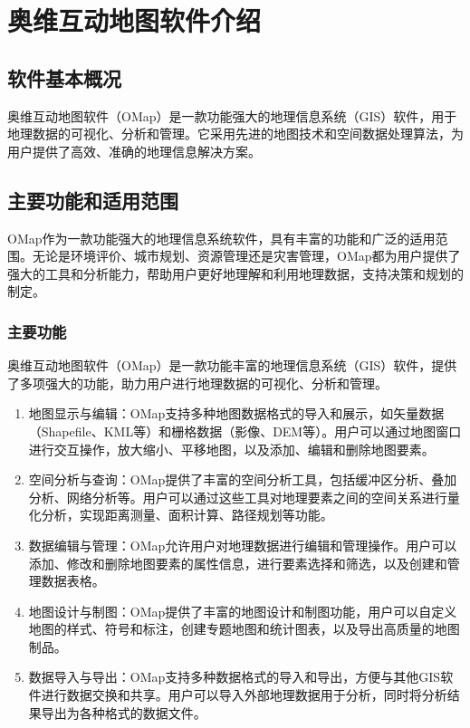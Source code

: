 \documentclass{cdut_thesis_twoside}
\begin{document}
\newpage
\setcounter{page}{1}


\newpage\null\par
\section{奥维互动地图软件介绍}
\subsection{软件基本概况}
奥维互动地图软件（OMap）是一款功能强大的地理信息系统（GIS）软件，用于地理数据的可视化、分析和管理。它采用先进的地图技术和空间数据处理算法，为用户提供了高效、准确的地理信息解决方案。

\subsection{主要功能和适用范围}
OMap作为一款功能强大的地理信息系统软件，具有丰富的功能和广泛的适用范围。无论是环境评价、城市规划、资源管理还是灾害管理，OMap都为用户提供了强大的工具和分析能力，帮助用户更好地理解和利用地理数据，支持决策和规划的制定。

\subsubsection{主要功能}
奥维互动地图软件（OMap）是一款功能丰富的地理信息系统（GIS）软件，提供了多项强大的功能，助力用户进行地理数据的可视化、分析和管理。
\begin{enumerate}
    \item 地图显示与编辑：OMap支持多种地图数据格式的导入和展示，如矢量数据（Shapefile、KML等）和栅格数据（影像、DEM等）。用户可以通过地图窗口进行交互操作，放大缩小、平移地图，以及添加、编辑和删除地图要素。
    \item 空间分析与查询：OMap提供了丰富的空间分析工具，包括缓冲区分析、叠加分析、网络分析等。用户可以通过这些工具对地理要素之间的空间关系进行量化分析，实现距离测量、面积计算、路径规划等功能。
    \item 数据编辑与管理：OMap允许用户对地理数据进行编辑和管理操作。用户可以添加、修改和删除地图要素的属性信息，进行要素选择和筛选，以及创建和管理数据表格。
    \item 地图设计与制图：OMap提供了丰富的地图设计和制图功能，用户可以自定义地图的样式、符号和标注，创建专题地图和统计图表，以及导出高质量的地图制品。
    \item 数据导入与导出：OMap支持多种数据格式的导入和导出，方便与其他GIS软件进行数据交换和共享。用户可以导入外部地理数据用于分析，同时将分析结果导出为各种格式的数据文件。
\end{enumerate}
\end{document}
